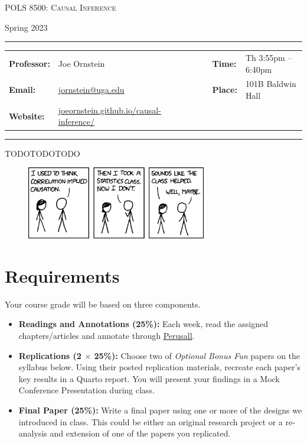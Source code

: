\documentclass[11pt, letterpaper]{article}
\begin{document}
\begin{center}
{\Large \textsc{POLS 8500: Causal Inference}}
\end{center}
\begin{center}
{\large Spring 2023}
\end{center}

\begin{center}
\rule{6.5in}{0.4pt}
\begin{minipage}[t]{.96\textwidth}
\begin{tabular}{llcccll}
\textbf{Professor:} & Joe Ornstein & & &  & \textbf{Time:} & Th 3:55pm -- 6:40pm \\
\textbf{Email:} &  \href{mailto:jornstein@uga.edu}{jornstein@uga.edu} & & & & \textbf{Place:} & 101B Baldwin Hall\\
\textbf{Website:} & \href{https://joeornstein.github.io/causal-inference/}{joeornstein.github.io/causal-inference/} & & & & &
\end{tabular}
\end{minipage}
\rule{6.5in}{0.4pt}
\end{center}
\vspace{.15cm}
\setlength{\unitlength}{1in}
\renewcommand{\arraystretch}{2}

TODOTODOTODO

\begin{figure}[h]
	\centering
	\href{https://xkcd.com/552/}{\includegraphics[width = 0.7\textwidth]{img/correlation.png}}
\end{figure}

\section*{Requirements}

Your course grade will be based on three components.

\begin{itemize}
	\item \textbf{Readings and Annotations (25\%):} Each week, read the assigned chapters/articles and annotate through \href{https://app.perusall.com/courses/causal-inference-931431581/_/dashboard/assignments/bkheY4mFQz6gWEYur}{Perusall}.
	\item \textbf{Replications (2 $\times$ 25\%):} Choose two of \textit{Optional Bonus Fun} papers on the syllabus below. Using their posted replication materials, recreate each paper's key results in a Quarto report. You will present your findings in a Mock Conference Presentation during class.
	\item \textbf{Final Paper (25\%):} Write a final paper using one or more of the designs we introduced in class. This could be either an original research project or a re-analysis and extension of one of the papers you replicated.
\end{itemize}
\end{document}
